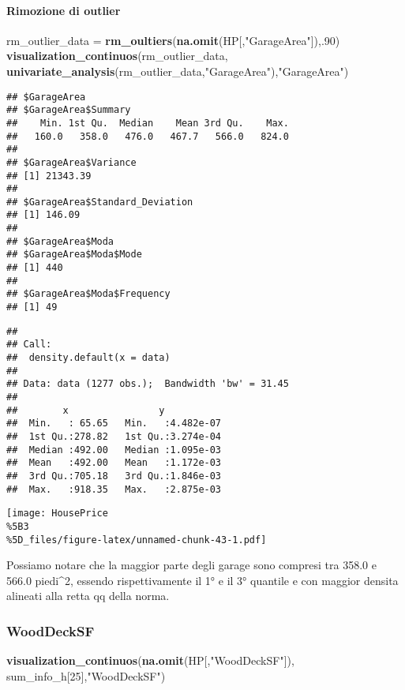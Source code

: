\documentclass[
]{article}
\newenvironment{Shaded}{\begin{snugshade}}{\end{snugshade}}
\newcommand{\DecValTok}[1]{\textcolor[rgb]{0.00,0.00,0.81}{#1}}
\newcommand{\FunctionTok}[1]{\textcolor[rgb]{0.13,0.29,0.53}{\textbf{#1}}}
\newcommand{\NormalTok}[1]{#1}
\newcommand{\OtherTok}[1]{\textcolor[rgb]{0.56,0.35,0.01}{#1}}
\newcommand{\StringTok}[1]{\textcolor[rgb]{0.31,0.60,0.02}{#1}}
\begin{document}
\paragraph{Rimozione di outlier}\label{rimozione-di-outlier-9}

\begin{Shaded}
\begin{Highlighting}[]
\NormalTok{rm\_outlier\_data }\OtherTok{=} \FunctionTok{rm\_oultiers}\NormalTok{(}\FunctionTok{na.omit}\NormalTok{(HP[,}\StringTok{"GarageArea"}\NormalTok{]),.}\DecValTok{90}\NormalTok{)}
\FunctionTok{visualization\_continuos}\NormalTok{(rm\_outlier\_data, }\FunctionTok{univariate\_analysis}\NormalTok{(rm\_outlier\_data,}\StringTok{"GarageArea"}\NormalTok{),}\StringTok{"GarageArea"}\NormalTok{)}
\end{Highlighting}
\end{Shaded}

\begin{verbatim}
## $GarageArea
## $GarageArea$Summary
##    Min. 1st Qu.  Median    Mean 3rd Qu.    Max. 
##   160.0   358.0   476.0   467.7   566.0   824.0 
## 
## $GarageArea$Variance
## [1] 21343.39
## 
## $GarageArea$Standard_Deviation
## [1] 146.09
## 
## $GarageArea$Moda
## $GarageArea$Moda$Mode
## [1] 440
## 
## $GarageArea$Moda$Frequency
## [1] 49
\end{verbatim}

\begin{verbatim}
## 
## Call:
##  density.default(x = data)
## 
## Data: data (1277 obs.);  Bandwidth 'bw' = 31.45
## 
##        x                y            
##  Min.   : 65.65   Min.   :4.482e-07  
##  1st Qu.:278.82   1st Qu.:3.274e-04  
##  Median :492.00   Median :1.095e-03  
##  Mean   :492.00   Mean   :1.172e-03  
##  3rd Qu.:705.18   3rd Qu.:1.846e-03  
##  Max.   :918.35   Max.   :2.875e-03
\end{verbatim}

\texttt{[image: HousePrice\\\%5B3\\\%5D\_files/figure-latex/unnamed-chunk-43-1.pdf]}

Possiamo notare che la maggior parte degli garage sono compresi tra
358.0 e 566.0 piedi\^{}2, essendo rispettivamente il 1° e il 3° quantile
e con maggior densita alineati alla retta qq della norma.

\subsubsection{WoodDeckSF}\label{wooddecksf}

\begin{Shaded}
\begin{Highlighting}[]
\FunctionTok{visualization\_continuos}\NormalTok{(}\FunctionTok{na.omit}\NormalTok{(HP[,}\StringTok{"WoodDeckSF"}\NormalTok{]), sum\_info\_h[}\DecValTok{25}\NormalTok{],}\StringTok{"WoodDeckSF"}\NormalTok{)}
\end{Highlighting}
\end{Shaded}
\end{document}
